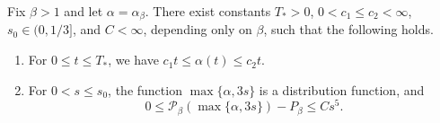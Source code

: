 \begin{proposition}\label{inp:qp-floor}
Fix $\beta>1$ and let $\alpha=\alpha_\beta$. There exist constants $T_*>0$,
$0<c_1\le c_2<\infty$, $s_0\in(0,1/3]$, and $C<\infty$, depending only on
$\beta$, such that the following holds.
\begin{enumerate}[label=\textup{(\roman*)}]
\item For $0\le t\le T_*$, we have $c_1t\le\alpha(t)\le c_2t$.
\item For $0<s\le s_0$, the function $\max\{\alpha,3s\}$ is a distribution
 function, and
 \begin{equation}\label{b:eq:external-floor}
  0\le\mathcal P_\beta(\max\{\alpha,3s\})-P_\beta\le Cs^5.
 \end{equation}
\end{enumerate}
\end{proposition}

